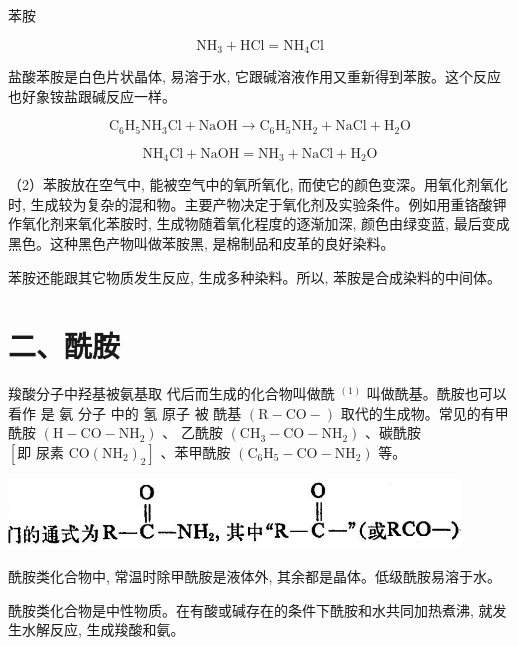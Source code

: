 \documentclass[10pt]{article}
\begin{document}
苯胺

\[
{\mathrm{{NH}}}_{3} + \mathrm{{HCl}} = {\mathrm{{NH}}}_{4}\mathrm{{Cl}}
\]

盐酸苯胺是白色片状晶体, 易溶于水, 它跟碱溶液作用又重新得到苯胺。这个反应也好象铵盐跟碱反应一样。

\[
{\mathrm{C}}_{6}{\mathrm{H}}_{5}{\mathrm{{NH}}}_{3}\mathrm{{Cl}} + \mathrm{{NaOH}} \rightarrow {\mathrm{C}}_{6}{\mathrm{H}}_{5}{\mathrm{{NH}}}_{2} + \mathrm{{NaCl}} + {\mathrm{H}}_{2}\mathrm{O}
\]

\[
{\mathrm{{NH}}}_{4}\mathrm{{Cl}} + \mathrm{{NaOH}} = {\mathrm{{NH}}}_{3} + \mathrm{{NaCl}} + {\mathrm{H}}_{2}\mathrm{O}
\]

（2）苯胺放在空气中, 能被空气中的氧所氧化, 而使它的颜色变深。用氧化剂氧化时, 生成较为复杂的混和物。主要产物决定于氧化剂及实验条件。例如用重铬酸钾作氧化剂来氧化苯胺时, 生成物随着氧化程度的逐渐加深, 颜色由绿变蓝, 最后变成黑色。这种黑色产物叫做苯胺黑, 是棉制品和皮革的良好染料。

苯胺还能跟其它物质发生反应, 生成多种染料。所以, 苯胺是合成染料的中间体。

\section*{二、酰胺}

羧酸分子中羟基被氨基取 代后而生成的化合物叫做酰 \({}^{\left( 1\right) }\) 叫做酰基。酰胺也可以看作 是 氨 分子 中的 氢 原子 被 酰基 \(\left( {\mathrm{R} - \mathrm{{CO}} - }\right)\) 取代的生成物。常见的有甲酰胺 \(\left( {\mathrm{H} - \mathrm{{CO}} - {\mathrm{{NH}}}_{2}}\right)\) 、 乙酰胺 \(\left( {{\mathrm{{CH}}}_{3} - \mathrm{{CO}} - {\mathrm{{NH}}}_{2}}\right)\) 、碳酰胺 \(\left\lbrack {\mathrm{即}\text{ 尿素 }\mathrm{{CO}}{\left( {\mathrm{{NH}}}_{2}\right) }_{2}}\right\rbrack\) 、苯甲酰胺 \(\left( {{\mathrm{C}}_{6}{\mathrm{H}}_{5} - \mathrm{{CO}} - {\mathrm{{NH}}}_{2}}\right)\) 等。

\begin{center}
\includegraphics[max width=0.9\textwidth]{images/01912d16-be99-77bb-9535-4f3ed8d9946f_153_343120.jpg}
\end{center}

酰胺类化合物中, 常温时除甲酰胺是液体外, 其余都是晶体。低级酰胺易溶于水。

酰胺类化合物是中性物质。在有酸或碱存在的条件下酰胺和水共同加热煮沸, 就发生水解反应, 生成羧酸和氨。
\end{document}
